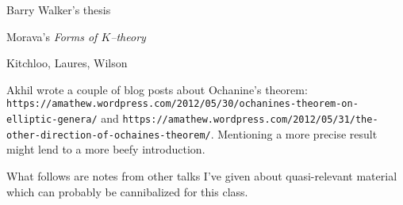\documentclass[12pt]{book}
\begin{document}
Barry Walker's thesis

Morava's \textit{Forms of $K$--theory}

Kitchloo, Laures, Wilson

Akhil wrote a couple of blog posts about Ochanine's theorem: \texttt{https://amathew.wordpress.com/2012/05/30/ochanines-theorem-on-elliptic-genera/} and \texttt{https://amathew.wordpress.com/2012/05/31/the-other-direction-of-ochaines-theorem/}. Mentioning a more precise result might lend to a more beefy introduction.




\newpage
\newpage
\newpage

\vspace{20\baselineskip}

\begin{center}
What follows are notes from other talks I've given about quasi-relevant material which can probably be cannibalized for this class.
\end{center}



% 
\end{document}
